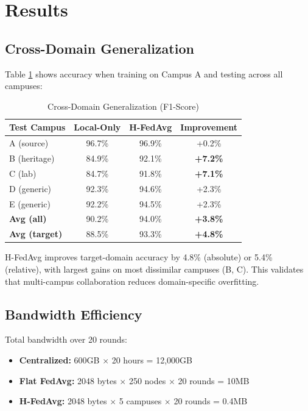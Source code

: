 \documentclass[conference]{IEEEtran}
\begin{document}
\section{Results}

\subsection{Cross-Domain Generalization}

Table \ref{tab:cross_domain} shows accuracy when training on Campus A and testing across all campuses:

\begin{table}[h]
\centering
\caption{Cross-Domain Generalization (F1-Score)}
\label{tab:cross_domain}
\begin{tabular}{lccc}
\toprule
\textbf{Test Campus} & \textbf{Local-Only} & \textbf{H-FedAvg} & \textbf{Improvement} \\
\midrule
A (source) & 96.7\% & 96.9\% & +0.2\% \\
B (heritage) & 84.9\% & 92.1\% & \textbf{+7.2\%} \\
C (lab) & 84.7\% & 91.8\% & \textbf{+7.1\%} \\
D (generic) & 92.3\% & 94.6\% & +2.3\% \\
E (generic) & 92.2\% & 94.5\% & +2.3\% \\
\midrule
\textbf{Avg (all)} & 90.2\% & 94.0\% & \textbf{+3.8\%} \\
\textbf{Avg (target)} & 88.5\% & 93.3\% & \textbf{+4.8\%} \\
\bottomrule
\end{tabular}
\end{table}

H-FedAvg improves target-domain accuracy by 4.8\% (absolute) or 5.4\% (relative), with largest gains on most dissimilar campuses (B, C). This validates that multi-campus collaboration reduces domain-specific overfitting.

\subsection{Bandwidth Efficiency}

Total bandwidth over 20 rounds:
\begin{itemize}
    \item \textbf{Centralized:} 600GB $\times$ 20 hours = 12,000GB
    \item \textbf{Flat FedAvg:} 2048 bytes $\times$ 250 nodes $\times$ 20 rounds = 10MB
    \item \textbf{H-FedAvg:} 2048 bytes $\times$ 5 campuses $\times$ 20 rounds = 0.4MB
\end{itemize}
\end{document}
